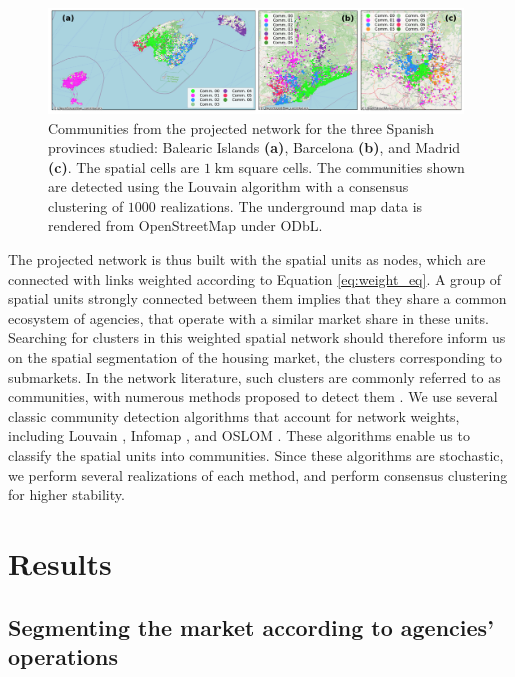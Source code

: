 \begin{figure}
    \caption[Market segmentation for $1 \; \textrm{km}$ square cells.]{ Communities from the projected network for the three Spanish provinces studied: Balearic Islands \textbf{(a)}, Barcelona \textbf{(b)}, and Madrid \textbf{(c)}. The spatial cells are $1 \; \textrm{km}$ square cells. The communities shown are detected using the Louvain algorithm with a consensus clustering of $1000$ realizations. The underground map data is rendered from OpenStreetMap under ODbL.}
    \label{fig:cell_1000}
    \centering
    \includegraphics[width = 0.98\textwidth]{Figs/Idealista_segmentation/Cell_communities.pdf}
\end{figure}

The projected network is thus built with the spatial units as nodes, which are connected with links weighted according to Equation \ref{eq:weight_eq}. A group of spatial units strongly connected between them implies that they share a common ecosystem of agencies, that operate with a similar market share in these units.
Searching for clusters in this weighted spatial network should therefore inform us on the spatial segmentation of the housing market, the clusters corresponding to submarkets. In the network literature, such clusters are commonly referred to as communities, with numerous methods proposed to detect them \cite{fortunato2010community}. We use several classic community detection algorithms \cite{newman2004finding,infomap,Louvain,Louvain-Leiden,OSLOM} that account for network weights, including Louvain \cite{Louvain-Leiden}, Infomap \cite{infomap}, and OSLOM \cite{OSLOM}. These algorithms enable us to classify the spatial units into communities. Since these algorithms are stochastic, we perform several realizations of each method, and perform consensus clustering \cite{lancichinetti2012consensus} for higher stability.

\section{Results}
\label{sec:results}

\subsection{Segmenting the market according to agencies' operations}\label{sec:segmentation_cells}

